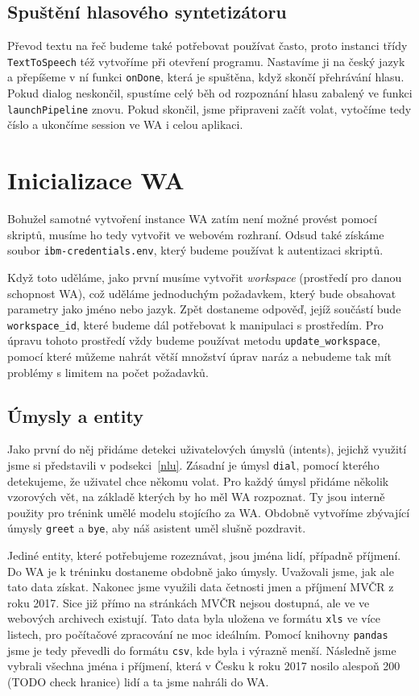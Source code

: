 \subsection{Spuštění hlasového syntetizátoru}

Převod textu na řeč budeme také potřebovat používat často, proto instanci
třídy \texttt{TextToSpeech} též vytvoříme při otevření programu. Nastavíme
ji na český jazyk a přepíšeme v ní funkci \texttt{onDone}, která je spuštěna,
když skončí přehrávání hlasu. Pokud dialog neskončil, spustíme celý běh
od rozpoznání hlasu zabalený ve funkci \texttt{launchPipeline} znovu. Pokud
skončil, jsme připraveni začít volat, vytočíme tedy číslo a ukončíme session ve
WA i celou aplikaci.

\section{Inicializace WA}\label{wainit}

Bohužel samotné vytvoření instance WA zatím není možné provést pomocí skriptů,
musíme ho tedy vytvořit ve webovém rozhraní. Odsud také získáme soubor
\texttt{ibm-credentials.env}, který budeme používat k autentizaci skriptů.

Když toto uděláme, jako první musíme vytvořit \textit{workspace}
(prostředí pro danou schopnost WA), což uděláme
jednoduchým požadavkem, který bude obsahovat parametry jako jméno nebo jazyk.
Zpět dostaneme odpověď, jejíž součástí bude \texttt{workspace\_id}, které budeme
dál potřebovat k manipulaci s prostředím. Pro úpravu tohoto prostředí
vždy budeme používat metodu \texttt{update\_workspace}, pomocí které můžeme
nahrát větší množství úprav naráz a nebudeme tak mít problémy s limitem na
počet požadavků.

\subsection{Úmysly a entity}

Jako první do něj přidáme detekci uživatelových úmyslů (intents), jejichž využití
jsme si představili v podsekci~\ref{nlu}. Zásadní je úmysl
\texttt{dial}, pomocí kterého detekujeme, že uživatel chce někomu volat. Pro
každý úmysl přidáme několik vzorových vět, na základě kterých by ho měl WA
rozpoznat. Ty jsou interně použity pro trénink umělé modelu stojícího za WA.
Obdobně vytvoříme zbývající úmysly \texttt{greet} a \texttt{bye}, aby náš
asistent uměl slušně pozdravit.

Jediné entity, které potřebujeme rozeznávat, jsou jména lidí, případně příjmení.
Do WA je k tréninku dostaneme obdobně jako úmysly. Uvažovali jsme, jak ale tato
data získat. Nakonec jsme využili data četnosti jmen a příjmení MVČR z roku 2017.
Sice již přímo na stránkách MVČR nejsou dostupná, ale ve ve webových archivech
existují. Tato data byla uložena ve formátu \texttt{xls} ve více listech, pro
počítačové zpracování ne moc ideálním. Pomocí knihovny \texttt{pandas} jsme je
tedy převedli do formátu \texttt{csv}, kde byla i výrazně menší. Následně jsme
vybrali všechna jména i příjmení, která v Česku k roku 2017 nosilo alespoň
200 (TODO check hranice) lidí a ta jsme nahráli do WA.

